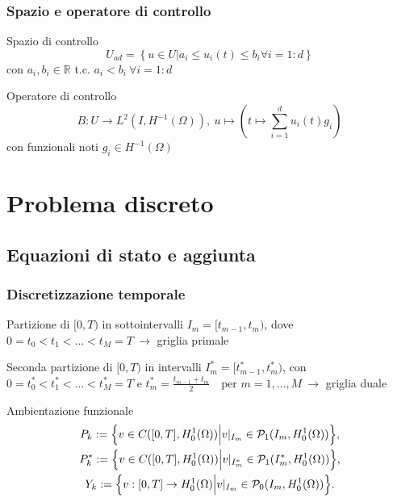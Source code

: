 \documentclass{beamer}
\theoremstyle{definition}
\theoremstyle{remark}
\theoremstyle{plain}
\theoremstyle{definition}
\begin{document}
\begin{frame}
\frametitle{Spazio e operatore di controllo}
Spazio di controllo
\begin{equation}
U_{ad} = \left\{ u \in U | a_i \leq u_i(t) \leq b_i {\forall}i=1:d  \right\}
\label{eq:208}
\end{equation}
con $a_i, b_i \in \mathbb{R}$ t.c. $a_i<b_i \ {\forall}i=1:d$


Operatore di controllo
\begin{equation}
B : U \rightarrow L^2(I,{H^{-1}(\Omega)}),\ u\mapsto \left( t\mapsto\sum_{i=1}^d u_i(t)g_i \right)
\label{eq:209}
\end{equation}
con funzionali noti $g_i \in {H^{-1}(\Omega)}$
\end{frame}


\section{Problema discreto}
\subsection{Equazioni di stato e aggiunta}
\begin{frame}
\frametitle{Discretizzazione temporale}
Partizione di $[0,T)$ in sottointervalli $I_m=[t_{m-1},t_m)$, dove $0=t_0<t_1<\dots<t_M=T\ \longrightarrow $ griglia primale

 Seconda partizione di $ [0,T) $ in intervalli $I^*_m=[t^*_{m-1},t^*_m)$, con $0=t^*_0<t^*_1<\dots<t^*_M=T$ e $t^*_m=\frac{t_{m-1}+t_m}{2}\quad\text{per $m=1,\dots,M$} \ \longrightarrow $ griglia duale
 
 Ambientazione funzionale
 \begin{gather*}
P_k:=\Bigl\{v\in C([0,T],H^1_0(\Omega))\Bigl| v|_{I_{m}}\in \mathcal{P}_1(I_m,H^1_0(\Omega))\Bigr\},\\
P^*_k:=\Bigl\{v\in C([0,T],H^1_0(\Omega))\Bigl| v|_{I^*_{m}}\in \mathcal{P}_1(I^*_m,H^1_0(\Omega))\Bigr\},\\  
  Y_k:=\Bigl\{v:[0,T]\to H^1_0(\Omega)\Bigl| v|_{I_{m}}\in \mathcal{P}_0(I_m,H^1_0(\Omega))\Bigr\}.
\end{gather*}
\end{frame}
\end{document}
